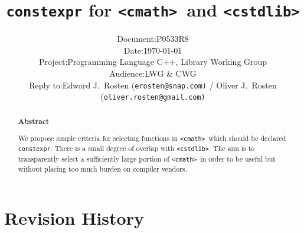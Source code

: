 \documentclass[prd,twocolumn,amsmath,amssymb,nofootinbib,eqsecnum]{revtex4-1}
\newcommand{\constexpr}{\code{constexpr}\xspace}
\newcommand{\code}[1]{{\tt #1}}
\newcommand{\header}[1]{{\tt <#1>}}
\newcommand{\cmath}{\header{cmath}}
\newcommand{\cstdlib}{\header{cstdlib}}
\begin{document}
\title{\constexpr for \cmath\ and \cstdlib}

\author{
\hspace{11.5em}
\begin{tabular}{ll}
	Document: & P0533R8
\\
	Date: & \today
\\
	Project: & Programming Language C++, Library Working Group
\\
	Audience: & LWG \& CWG
\\
	Reply to: & Edward J.\ Rosten {(\tt erosten@snap.com)}
 / Oliver J.\ Rosten {(\tt oliver.rosten@gmail.com)}
\end{tabular}
}

\begin{abstract}

\begin{center} {\bf Abstract} \end{center}
We propose simple criteria for selecting functions in \cmath\ which should be
declared \constexpr. There is a small degree of overlap with \cstdlib.
 The aim is to transparently select a sufficiently large portion of \cmath\ 
in order to be useful but without placing too much burden on compiler vendors.
	
\end{abstract}


\maketitle

\tableofcontents

\section{Revision History}
\end{document}
